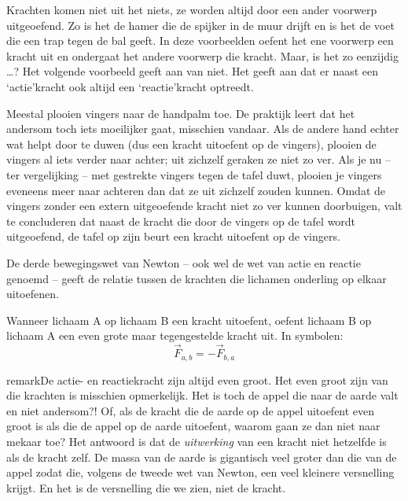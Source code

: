 \documentclass{ximera}
\begin{document}
	\author{Bart Lambregs}
    \xmsource\xmuitleg

Krachten komen niet uit het niets, ze worden altijd door een ander voorwerp uitgeoefend. Zo is het de hamer die de spijker in de muur drijft en is het de voet die een trap tegen de bal geeft. In deze voorbeelden oefent het ene voorwerp een kracht uit en ondergaat het andere voorwerp die kracht. Maar, is het zo eenzijdig \ldots? Het volgende voorbeeld geeft aan van niet. Het geeft aan dat er naast een `actie'kracht ook altijd een `reactie'kracht optreedt.

Meestal plooien vingers naar de handpalm toe. De praktijk leert dat het andersom toch iets moeilijker gaat, misschien vandaar. Als de andere hand echter wat helpt door te duwen (dus een kracht uitoefent op de vingers), plooien de vingers al iets verder naar achter; uit zichzelf geraken ze niet zo ver. Als je nu -- ter vergelijking -- met gestrekte vingers tegen de tafel duwt, plooien je vingers eveneens meer naar achteren dan dat ze uit zichzelf zouden kunnen. Omdat de vingers zonder een extern uitgeoefende kracht niet zo ver kunnen doorbuigen, valt te concluderen dat naast de kracht die door de vingers op de tafel wordt uitgeoefend, de tafel op zijn beurt een kracht uitoefent op de vingers.


	
De derde bewegingswet van Newton -- ook wel de wet van actie en reactie genoemd -- geeft de relatie tussen de krachten die lichamen onderling op elkaar uitoefenen.

\begin{definition}\nl

Wanneer lichaam A op lichaam B een kracht uitoefent, oefent lichaam B op lichaam A een even grote maar tegengestelde kracht uit. In symbolen:
\begin{equation*}
	\vec{F}_{a,b}=-\vec{F}_{b,a}
\end{equation*}
\end{definition}

\begin{expandable}{remark}{De actie- en reactiekracht zijn altijd even groot.}
	Het even groot zijn van die krachten is misschien opmerkelijk. Het is toch de appel die naar de aarde valt en niet andersom?! Of, als de kracht die de aarde op de appel uitoefent even groot is als die de appel op de aarde uitoefent, waarom gaan ze dan niet naar mekaar toe? Het antwoord is dat de \emph{uitwerking} van een kracht niet hetzelfde is als de kracht zelf. De massa van de aarde is gigantisch veel groter dan die van de appel zodat die, volgens de tweede wet van Newton, een veel kleinere versnelling krijgt. En het is de versnelling die we zien, niet de kracht.
\end{expandable}
\end{document}
